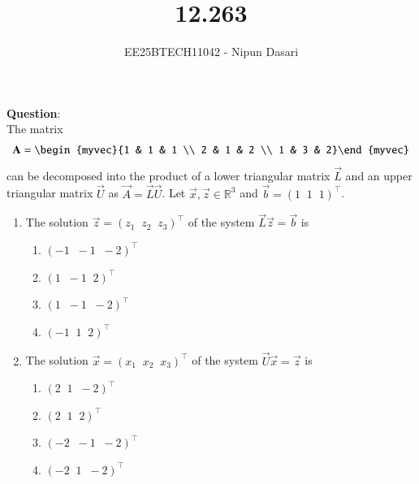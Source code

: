 \documentclass[journal]{IEEEtran}
\begin{document}
	
	
	\vspace{3cm}
	
	\title{12.263}
	\author{EE25BTECH11042 - Nipun Dasari}
	\maketitle
	
	\renewcommand{\thefigure}{\theenumi}
	\renewcommand{\thetable}{\theenumi}
	\setlength{\intextsep}{10pt}
	
	\renewcommand{\thetable}{\theenumi}
	
	\textbf{Question}:\\
	The matrix
	\begin{align}
		\vec{A} = \begin{myvec}{1 & 1 & 1 \\ 2 & 1 & 2 \\ 1 & 3 & 2}\end{myvec}
	\end{align}
	can be decomposed into the product of a lower triangular matrix $\vec{L}$ and an upper triangular matrix $\vec{U}$ as $\vec{A} = \vec{L}\vec{U}$. Let $\vec{x}, \vec{z} \in \mathbb{R}^3$ and $\vec{b} = (1 \;\; 1 \;\; 1)^\top$.
	\begin{enumerate}[label=\alph*)]
		\item The solution $\vec{z} = (z_1 \;\; z_2 \;\; z_3)^\top$ of the system $\vec{L}\vec{z} = \vec{b}$ is
		\begin{enumerate}[label=\roman*)]
			\item $(-1 \;\; -1 \;\; -2)^\top$
			\item $(1 \;\; -1 \;\; 2)^\top$
			\item $(1 \;\; -1 \;\; -2)^\top$
			\item $(-1 \;\; 1 \;\; 2)^\top$
		\end{enumerate}
		\item The solution $\vec{x} = (x_1 \;\; x_2 \;\; x_3)^\top$ of the system $\vec{U}\vec{x} = \vec{z}$ is
		\begin{enumerate}[label=\roman*)]
			\item $(2 \;\; 1 \;\; -2)^\top$
			\item $(2 \;\; 1 \;\; 2)^\top$
			\item $(-2 \;\; -1 \;\; -2)^\top$
			\item $(-2 \;\; 1 \;\; -2)^\top$
		\end{enumerate}
	\end{enumerate}
	
\end{document}
